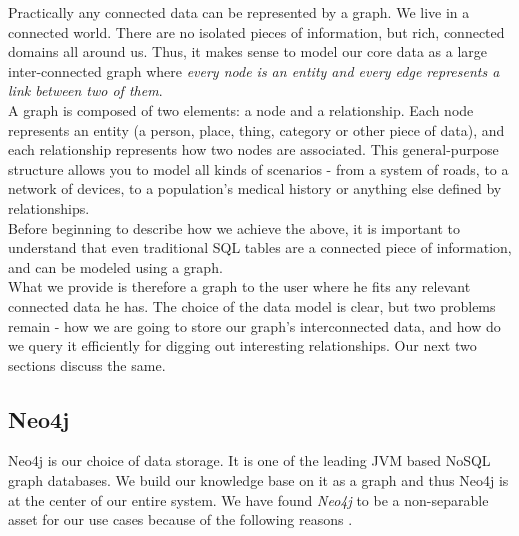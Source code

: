 Practically any connected data can be represented by a graph. We live in a connected world. There are no isolated pieces of information, but rich, connected domains all around us. Thus, it makes sense to model our core data as a large inter-connected graph where \emph{every node is an entity and every edge represents a link between two of them}.   \\



A graph is composed of two elements: a node and a relationship. Each node represents an entity (a person, place, thing, category or other piece of data), and each relationship represents how two nodes are associated. This general-purpose structure allows you to model all kinds of scenarios - from a system of roads, to a network of devices, to a population's medical history or anything else defined by relationships.  \\

Before beginning to describe how we achieve the above, it is important to understand that even traditional SQL tables are a connected piece of information, and can be modeled using a graph. \\

What we provide is therefore a graph to the user where he fits any relevant connected data he has. The choice of the data model is clear, but two problems remain - how we are going to store our graph's interconnected data, and how do we query it efficiently for digging out interesting relationships. Our next two sections discuss the same. \\

\subsection{Neo4j}

Neo4j \cite{neo}  is our choice of data storage. It is one of the leading JVM based NoSQL graph databases. We build our knowledge base on it as a graph and thus Neo4j is at the center of our entire system. We have found \emph{Neo4j} to be a non-separable asset for our use cases because of the following reasons \cite{neogdb}. \\

